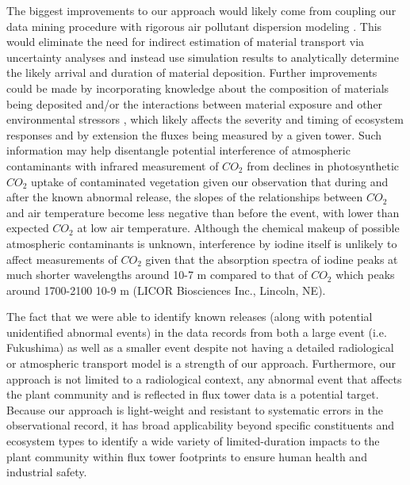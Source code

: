 \documentclass{article}
\begin{document}
The biggest improvements to our approach would likely come from coupling our data mining procedure with rigorous air pollutant dispersion modeling \cite[e.g.,][]{meszarosPredictabilityDispersionFukushimaderived2016}. This would eliminate the need for indirect estimation of material transport via uncertainty analyses and instead use simulation results to analytically determine the likely arrival and duration of material deposition. Further improvements could be made by incorporating knowledge about the composition of materials being deposited \citep{international2006iaea, meszarosPredictabilityDispersionFukushimaderived2016} and/or the interactions between material exposure and other environmental stressors \citep{mousseauPlantsLightIonizing2020}, which likely affects the severity and timing of ecosystem responses and by extension the fluxes being measured by a given tower. Such information may help disentangle potential interference of atmospheric contaminants with infrared measurement of $CO_2$ from declines in photosynthetic $CO_2$ uptake of contaminated vegetation given our observation that during and after the known abnormal release, the slopes of the relationships between $CO_2$ and air temperature become less negative than before the event, with lower than expected $CO_2$ at low air temperature. Although the chemical makeup of possible atmospheric contaminants is unknown, interference by iodine itself is unlikely to affect measurements of $CO_2$ given that the absorption spectra of iodine peaks at much shorter wavelengths around 10-7 m \citep{haynes2016crc} compared to that of $CO_2$ which peaks around 1700-2100 10-9 m (LICOR Biosciences Inc., Lincoln, NE).

The fact that we were able to identify known releases (along with potential unidentified abnormal events) in the data records from both a large event (i.e. Fukushima) as well as a smaller event despite not having a detailed radiological or atmospheric transport model is a strength of our approach. Furthermore, our approach is not limited to a radiological context, any abnormal event that affects the plant community and is reflected in flux tower data is a potential target. Because our approach is light-weight and resistant to systematic errors in the observational record, it has broad applicability beyond specific constituents and ecosystem types to identify a wide variety of limited-duration impacts to the plant community within flux tower footprints to ensure human health and industrial safety.

\end{document}
